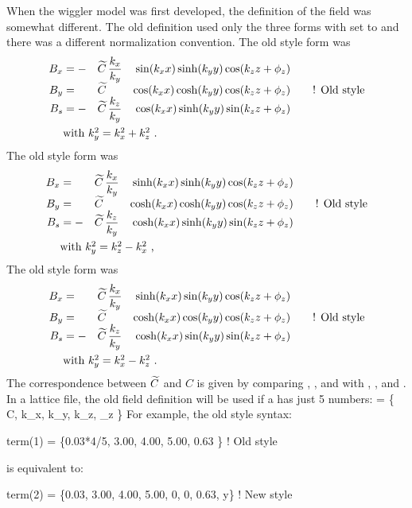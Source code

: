 { When the wiggler model was first developed, the definition
of the field was somewhat different. The old definition used only the three forms
with  set to  and there was a different normalization convention.
The old style  form was
\begin{alignat}{5}
  B_x &= -&\wt C \, &\dfrac{k_x}{k_y} & \sin(k_x x) \sinh(k_y y) \cos(\kzz) &\CRNEG
  B_y &=  &\wt C \, &                 & \cos(k_x x) \cosh(k_y y) \cos(\kzz) &\qquad \text{! Old style} \CRNEG
  B_s &= -&\wt C \, &\dfrac{k_z}{k_y} & \cos(k_x x) \sinh(k_y y) \sin(\kzz) &\label{f1} \\
  & \makebox[1pt][l]{with $k_y^2 = k_x^2 + k_z^2$ .} &&&&  \nonumber
\end{alignat}
The old style  form was
\begin{alignat}{5}
  B_x &=  &\wt C \, &\dfrac{k_x}{k_y} & \sinh(k_x x) \sinh(k_y y) \cos(\kzz) &\CRNEG
  B_y &=  &\wt C \, &                 & \cosh(k_x x) \cosh(k_y y) \cos(\kzz) &\qquad \text{! Old style} \CRNEG
  B_s &= -&\wt C \, &\dfrac{k_z}{k_y} & \cosh(k_x x) \sinh(k_y y) \sin(\kzz) &\label{f2} \\
  & \makebox[1pt][l]{with $k_y^2 = k_z^2 - k_x^2$ ,} &&&&  \nonumber
\end{alignat}
The old style  form was
\begin{alignat}{5}
  B_x &=  &\wt C \, &\dfrac{k_x}{k_y} & \sinh(k_x x) \sin(k_y y) \cos(\kzz) &\CRNEG
  B_y &=  &\wt C \, &                 & \cosh(k_x x) \cos(k_y y) \cos(\kzz) &\qquad \text{! Old style} \CRNEG
  B_s &= -&\wt C \, &\dfrac{k_z}{k_y} & \cosh(k_x x) \sin(k_y y) \sin(\kzz) &\label{f3} \\
  & \makebox[1pt][l]{with $k_y^2 = k_x^2 - k_z^2$ .} &&&& \nonumber
\end{alignat}
The correspondence between $\widetilde C$ and $C$ is given by comparing
, , and  with , , and . In
a lattice file, the old field definition will be used if a
 has just 5 numbers:
\Begineq
   = \{ \wt C, k_x, k_y, k_z, \phi_z \}
\Endeq
For example, the old style syntax:
\begin{example}
  term(1) = \{0.03*4/5, 3.00, 4.00, 5.00, 0.63 \}    ! Old style
\end{example}
is equivalent to:
\begin{example}
  term(2) = \{0.03, 3.00, 4.00, 5.00, 0, 0, 0.63, y\}  ! New style
\end{example}

}
